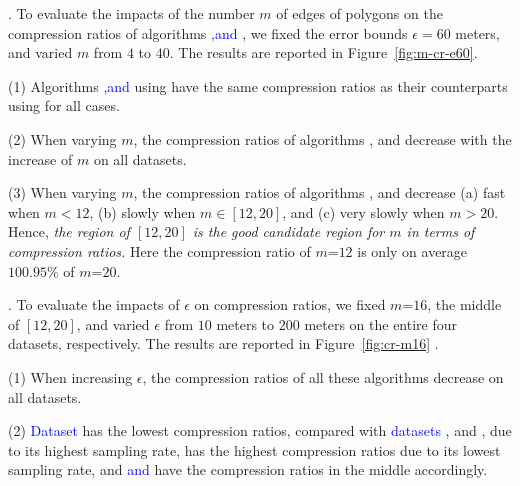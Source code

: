 .
To evaluate the impacts of   the number $m$ of edges of polygons on the
compression ratios of algorithms \textcolor{blue}{\cist ,\cista and \cisto}, we fixed the error bounds {$\epsilon =60$ meters}, and varied $m$ from $4$ to $40$. The results are reported in Figure~\ref{fig:m-cr-e60}.

\ni(1) Algorithms \textcolor{blue}{\cist ,\cista and \cisto} using \rpia have the same compression ratios as their counterparts using \cpia for all cases.

\ni(2) When varying $m$, the compression ratios of algorithms
{\cisto, \cist and \cista} decrease with the increase of $m$ on all datasets.

\ni(3) When varying $m$, the compression ratios of algorithms {\cisto, \cist and \cista} decrease (a) fast when $m < 12$, (b) slowly when $m \in [12, 20]$, and (c) very slowly when $m > 20$. Hence, \emph{the region of $[12, 20]$ is the good candidate region for $m$ in terms of compression ratios.}
Here the compression ratio of $m$=$12$ is only on average {$100.95\%$} of $m$=$20$.



.
To evaluate the impacts of $\epsilon$ on compression ratios, we fixed {$m$=$16$}, the middle of $[12, 20]$, and varied $\epsilon$ from $10$ meters to $200$ meters on the entire four datasets, respectively.
The results are reported in Figure~\ref{fig:cr-m16} .


\ni (1) When increasing $\epsilon$, the compression ratios of all these algorithms decrease on all datasets.

\ni (2) \textcolor{blue}{Dataset} \pricar has the lowest compression ratios, compared with \textcolor{blue}{datasets} \mopsi, \sercar and \geolife, due to its highest sampling rate,
\textcolor{blue}{\sercar} has the highest compression ratios due to its lowest sampling rate, and \textcolor{blue}{\geolife and \mopsi} have the compression ratios in the middle accordingly.

